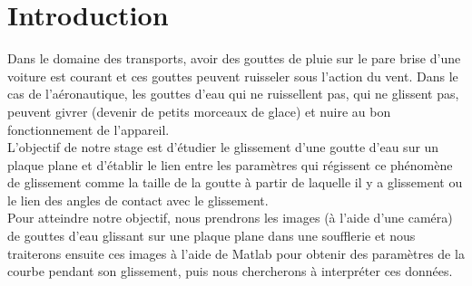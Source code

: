 
\section{Introduction}

Dans le domaine des transports, avoir des gouttes de pluie sur le pare brise d'une voiture est courant et ces gouttes peuvent ruisseler sous l'action du vent.
Dans le cas de l'aéronautique, les gouttes d'eau qui ne ruissellent pas, qui ne glissent pas, peuvent givrer (devenir de petits morceaux de glace) et nuire au bon fonctionnement de l'appareil.\\

L'objectif de notre stage est d'étudier le glissement d'une goutte d'eau sur un plaque plane et d'établir le lien entre les paramètres qui régissent ce phénomène de glissement comme la taille de la goutte à partir de laquelle il y a glissement ou le lien des angles de contact avec le glissement.\\

Pour atteindre notre objectif, nous prendrons les images (à l'aide d'une caméra) de gouttes d'eau glissant sur une plaque plane dans une soufflerie et nous traiterons ensuite ces images à l'aide de Matlab pour obtenir des paramètres de la courbe pendant son glissement, puis nous chercherons à interpréter ces données.
